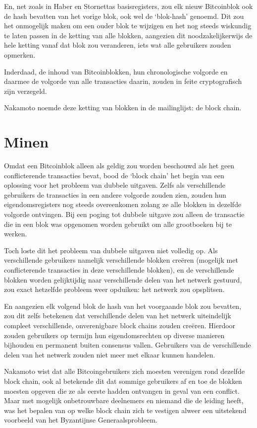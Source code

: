 \documentclass[
  a5paper,
  smalldemyvopaper,11pt,twoside,onecolumn,openright,extrafontsizes]{memoir}
\begin{document}
En, net zoals in Haber en Stornettas basisregisters, zou elk nieuw
Bitcoinblok ook de hash bevatten van het vorige blok, ook wel de
`blok-hash' genoemd. Dit zou het onmogelijk maken om een ouder blok te
wijzigen en het nog steeds wiskundig te laten passen in de ketting van
alle blokken, aangezien dit noodzakelijkerwijs de hele ketting vanaf dat
blok zou veranderen, iets wat alle gebruikers zouden opmerken.

Inderdaad, de inhoud van Bitcoinblokken, hun chronologische volgorde en
daarmee de volgorde van alle transacties daarin, zouden in feite
cryptografisch zijn verzegeld.

Nakamoto noemde deze ketting van blokken in de mailinglijst: de block
chain.

\section{Minen}\label{minen}

Omdat een Bitcoinblok alleen als geldig zou worden beschouwd als het
geen conflicterende transacties bevat, bood de `block chain' het begin
van een oplossing voor het probleem van dubbele uitgaven. Zelfs als
verschillende gebruikers de transacties in een andere volgorde zouden
zien, zouden hun eigendomsregisters nog steeds overeenkomen zolang ze
alle blokken in dezelfde volgorde ontvingen. Bij een poging tot dubbele
uitgave zou alleen de transactie die in een blok was opgenomen worden
gebruikt om alle grootboeken bij te werken.

Toch loste dit het probleem van dubbele uitgaven niet volledig op. Als
verschillende gebruikers namelijk verschillende blokken creëren
(mogelijk met conflicterende transacties in deze verschillende blokken),
en de verschillende blokken worden gelijktijdig naar verschillende delen
van het netwerk gestuurd, zou exact hetzelfde probleem weer opduiken:
het netwerk zou opsplitsen.

En aangezien elk volgend blok de hash van het voorgaande blok zou
bevatten, zou dit zelfs betekenen dat verschillende delen van het
netwerk uiteindelijk compleet verschillende, onverenigbare block chains
zouden creëren. Hierdoor zouden gebruikers op termijn hun
eigendomsrechten op diverse manieren bijhouden en permanent buiten
consensus vallen. Gebruikers van de verschillende delen van het netwerk
zouden niet meer met elkaar kunnen handelen.

Nakamoto wist dat alle Bitcoingebruikers zich moesten verenigen rond
dezelfde block chain, ook al betekende dit dat sommige gebruikers af en
toe de blokken moesten opgeven die ze als eerste hadden ontvangen in
geval van een conflict. Maar met mogelijk onbetrouwbare deelnemers en
niemand die de leiding heeft, was het bepalen van op welke block chain
zich te vestigen alweer een uitstekend voorbeeld van het Byzantijnse
Generaalsprobleem.
\end{document}
